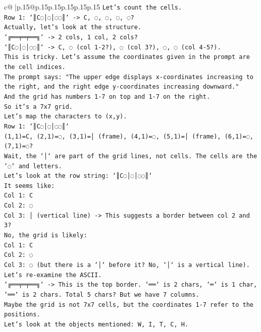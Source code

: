 \documentclass{article}
\begin{document}
{\begin{supertabular}{c@{$\;$}|p{.15\linewidth}@{}p{.15\linewidth}p{.15\linewidth}p{.15\linewidth}p{.15\linewidth}p{.15\linewidth}}
{{{\texttt{Let's count the cells.} \\
\texttt{Row 1: `║C◌│◌│◌◌║` {-}> C, ◌, ◌, ◌, ◌?} \\
\texttt{Actually, let's look at the structure.} \\
\texttt{`╔══╤═╤══╗` {-}> 2 cols, 1 col, 2 cols?} \\
\texttt{`║C◌│◌│◌◌║` {-}> C, ◌ (col 1{-}2?), ◌ (col 3?), ◌, ◌ (col 4{-}5?).} \\
\texttt{This is tricky. Let's assume the coordinates given in the prompt are the cell indices.} \\
\texttt{The prompt says: "The upper edge displays x{-}coordinates increasing to the right, and the right edge y{-}coordinates increasing downward."} \\
\texttt{And the grid has numbers 1{-}7 on top and 1{-}7 on the right.} \\
\texttt{So it's a 7x7 grid.} \\
\texttt{Let's map the characters to (x,y).} \\
\texttt{Row 1: `║C◌│◌│◌◌║`} \\
\texttt{(1,1)=C, (2,1)=◌, (3,1)=│ (frame), (4,1)=◌, (5,1)=│ (frame), (6,1)=◌, (7,1)=◌?} \\
\texttt{Wait, the `│` are part of the grid lines, not cells. The cells are the `◌` and letters.} \\
\texttt{Let's look at the row string: `║C◌│◌│◌◌║`} \\
\texttt{It seems like:} \\
\texttt{Col 1: C} \\
\texttt{Col 2: ◌} \\
\texttt{Col 3: │ (vertical line) {-}> This suggests a border between col 2 and 3?} \\
\texttt{No, the grid is likely:} \\
\texttt{Col 1: C} \\
\texttt{Col 2: ◌} \\
\texttt{Col 3: ◌ (but there is a `│` before it? No, `│` is a vertical line).} \\
\texttt{Let's re{-}examine the ASCII.} \\
\texttt{`╔══╤═╤══╗` {-}> This is the top border. `══` is 2 chars, `═` is 1 char, `══` is 2 chars. Total 5 chars? But we have 7 columns.} \\
\texttt{Maybe the grid is not 7x7 cells, but the coordinates 1{-}7 refer to the positions.} \\
\texttt{Let's look at the objects mentioned: W, I, T, C, H.} \\
}}}
\end{supertabular}}
\end{document}
